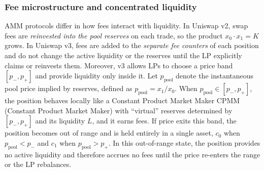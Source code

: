 \documentclass[10pt,conference,compsocconf]{IEEEtran}
\begin{document}






\subsubsection{Fee microstructure and concentrated liquidity}
AMM protocols differ in how fees interact with liquidity.
In Uniswap v2, swap fees are \emph{reinvested into the pool reserves} on each trade, so the product $x_0 \cdot x_1{=}K$ grows.
In Uniswap v3, fees are added to the \emph{separate fee counters} of each position and do not change the active liquidity or the reserves until the LP explicitly claims or reinvests them.
Moreover, v3 allows LPs to choose a price band $[p_{-},p_{+}]$ and provide liquidity only inside it.
Let $p_{\text{pool}}$ denote the instantaneous pool price implied by reserves, defined as
$p_{\text{pool}} = x_1/x_0$. 
When $p_{\text{pool}}\in[p_{-},p_{+}]$, the position behaves locally like a Constant Product Market Maker CPMM (Constant Product Market Maker) with ``virtual'' reserves determined by $[p_{-},p_{+}]$ and its liquidity $L$, and it earns fees. 
If price exits this band, the position becomes out of range and is held entirely in a single asset, $c_0$ when $p_{\text{pool}}<p_{-}$ and $c_1$ when $p_{\text{pool}}>p_{+}$. 
In this out-of-range state, the position provides no active liquidity and therefore accrues no fees until the price re-enters the range or the LP rebalances.
\end{document}
